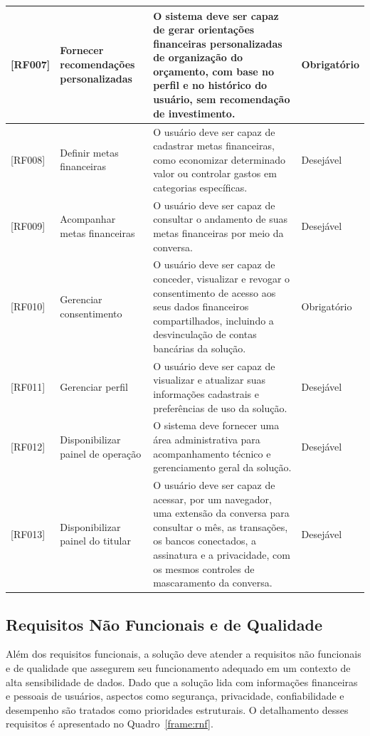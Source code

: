 \begin{longtable}{|L{1.5cm}|L{3.2cm}|L{7.3cm}|L{2.1cm}|}
{[RF007]} & Fornecer recomendações personalizadas & O sistema deve ser capaz de gerar orientações financeiras personalizadas de organização do orçamento, com base no perfil e no histórico do usuário, sem recomendação de investimento. & Obrigatório \\ \hline
{[RF008]} & Definir metas financeiras & O usuário deve ser capaz de cadastrar metas financeiras, como economizar determinado valor ou controlar gastos em categorias específicas. & Desejável \\ \hline
{[RF009]} & Acompanhar metas financeiras & O usuário deve ser capaz de consultar o andamento de suas metas financeiras por meio da conversa. & Desejável \\ \hline
{[RF010]} & Gerenciar consentimento & O usuário deve ser capaz de conceder, visualizar e revogar o consentimento de acesso aos seus dados financeiros compartilhados, incluindo a desvinculação de contas bancárias da solução. & Obrigatório \\ \hline
{[RF011]} & Gerenciar perfil & O usuário deve ser capaz de visualizar e atualizar suas informações cadastrais e preferências de uso da solução. & Desejável \\ \hline
{[RF012]} & Disponibilizar painel de operação & O sistema deve fornecer uma área administrativa para acompanhamento técnico e gerenciamento geral da solução. & Desejável \\ \hline
{[RF013]} & Disponibilizar painel do titular & O usuário deve ser capaz de acessar, por um navegador, uma extensão da conversa para consultar o mês, as transações, os bancos conectados, a assinatura e a privacidade, com os mesmos controles de mascaramento da conversa. & Desejável \\ \hline
\end{longtable}

\subsection{Requisitos Não Funcionais e de Qualidade}

Além dos requisitos funcionais, a solução deve atender a requisitos não funcionais e de qualidade que assegurem seu funcionamento adequado em um contexto de alta sensibilidade de dados. Dado que a solução lida com informações financeiras e pessoais de usuários, aspectos como segurança, privacidade, confiabilidade e desempenho são tratados como prioridades estruturais. O detalhamento desses requisitos é apresentado no Quadro~\ref{frame:rnf}.

